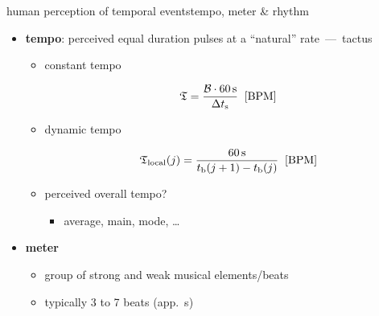         \begin{frame}{human perception of temporal events}{tempo, meter \& rhythm}
            \vspace{-2mm}
            \begin{itemize}
                \item	\textbf{tempo}: perceived equal duration pulses at a ``natural'' rate~---~tactus
                    \begin{itemize}
                        
                        \item<1->	constant tempo
                            \begin{footnotesize}
                            \begin{equation*}\label{eq:tempo_mean}
                                \mathfrak{T} = \frac{ \mathcal{B}\cdot \unit[60]{s}}{\Delta t_\mathrm{s}}\;\; [\unit{BPM}] 
                            \end{equation*}
                            \end{footnotesize}
                        \item<1->	dynamic tempo
                            \begin{footnotesize}
                            \begin{equation*}
                                \mathfrak{T}_\mathrm{local}(j) = \frac{\unit[60]{s}}{t_\mathrm{b}(j+1)-t_\mathrm{b}(j)}\;\; [\unit{BPM}] 
                            \end{equation*}
                            \end{footnotesize}
                            
                            
                        \item    perceived overall tempo?
                            \begin{itemize}
                                \item	average, main, mode, \ldots
                            \end{itemize}
                    \end{itemize}
                \item<2->	\textbf{meter}
                    \begin{itemize}
                        \item	group of strong and weak musical elements/beats
                        
                        \item	typically 3 to 7 beats (app.\ \unit[5]{s})
                    \end{itemize}
                

\end{itemize}
\end{frame}
